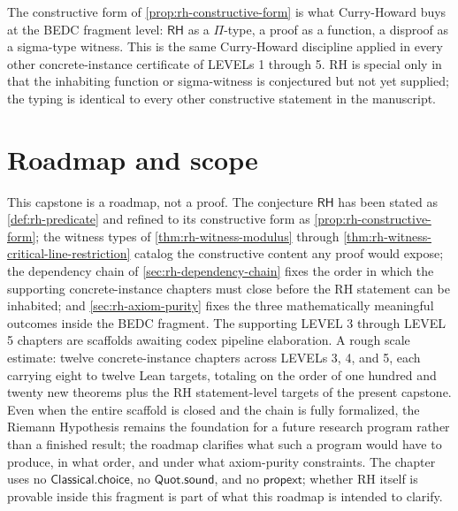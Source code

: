 \begin{remark}
\label{rem:rh-curry-howard}
The constructive form of \autoref{prop:rh-constructive-form} is what Curry-Howard buys at the BEDC fragment level: $\mathsf{RH}$ as a $\Pi$-type, a proof as a function, a disproof as a sigma-type witness. This is the same Curry-Howard discipline applied in every other concrete-instance certificate of LEVELs 1 through 5. RH is special only in that the inhabiting function or sigma-witness is conjectured but not yet supplied; the typing is identical to every other constructive statement in the manuscript.
\end{remark}

\section{Roadmap and scope}
\label{sec:rh-roadmap-scope}

This capstone is a roadmap, not a proof. The conjecture $\mathsf{RH}$ has been stated as \autoref{def:rh-predicate} and refined to its constructive form as \autoref{prop:rh-constructive-form}; the witness types of \autoref{thm:rh-witness-modulus} through \autoref{thm:rh-witness-critical-line-restriction} catalog the constructive content any proof would expose; the dependency chain of \autoref{sec:rh-dependency-chain} fixes the order in which the supporting concrete-instance chapters must close before the RH statement can be inhabited; and \autoref{sec:rh-axiom-purity} fixes the three mathematically meaningful outcomes inside the BEDC fragment. The supporting LEVEL 3 through LEVEL 5 chapters are scaffolds awaiting codex pipeline elaboration. A rough scale estimate: twelve concrete-instance chapters across LEVELs 3, 4, and 5, each carrying eight to twelve Lean targets, totaling on the order of one hundred and twenty new theorems plus the RH statement-level targets of the present capstone. Even when the entire scaffold is closed and the chain is fully formalized, the Riemann Hypothesis remains the foundation for a future research program rather than a finished result; the roadmap clarifies what such a program would have to produce, in what order, and under what axiom-purity constraints. The chapter uses no $\mathsf{Classical.choice}$, no $\mathsf{Quot.sound}$, and no $\mathsf{propext}$; whether RH itself is provable inside this fragment is part of what this roadmap is intended to clarify.
